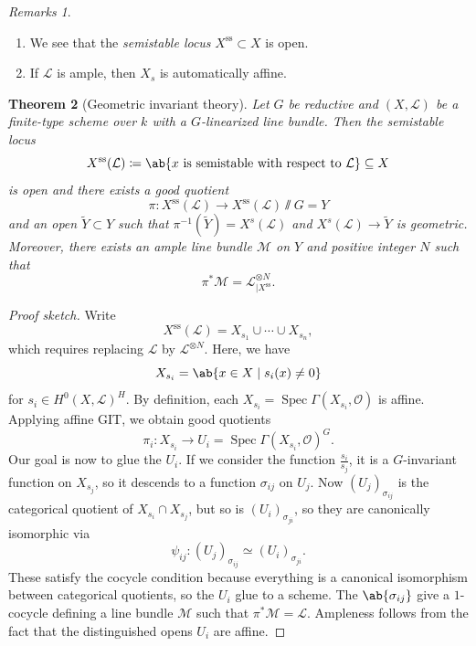 \documentclass{amsart}
\newtheorem{thm}{Theorem}[section]
\theoremstyle{definition}
\theoremstyle{remark}
\newtheorem{rmks}[thm]{Remarks}
\theoremstyle{plain}
\theoremstyle{definition}
\theoremstyle{remark}
\newcommand{\mc}[1]{\mathcal{#1}}
\newcommand{\on}[1]{\operatorname{#1}}
\newcommand{\1}{\mathbf{1}}
\newcommand{\2}{\mathbf{2}}
\newcommand{\3}{\mathbf{3}}
\DeclareMathOperator{\Spec}{Spec}
\begin{document}
\begin{rmks}\leavevmode
    \begin{enumerate}
        \item We see that the \textit{semistable locus} \(X^{\on{ss}} \subset X\) is open.
        \item If \(\mc{L}\) is ample, then \(X_s\) is automatically affine.
    \end{enumerate}
\end{rmks}

\begin{thm}[Geometric invariant theory]
    Let \(G\) be reductive and \((X, \mc{L})\) be a finite-type scheme over \(k\) with a \(G\)-linearized line bundle. Then the \textit{semistable locus}
    \[ X^{\on{ss}}(\mc{L}) \coloneqq \ab\{ x \text{ is semistable with respect to } \mc{L} \} \subseteq X \]
    is open and there exists a good quotient
    \[ \pi \colon X^{\on{ss}}(\mc{L}) \to X^{\on{ss}}(\mc{L}) \sslash G = Y \]
    and an open \(\tilde{Y} \subset Y\) such that \(\pi^{-1}(\tilde{Y}) = X^s(\mc{L})\) and \(X^s(\mc{L}) \to \tilde{Y}\) is geometric. Moreover, there exists an ample line bundle \(\mc{M}\) on \(Y\) and positive integer \(N\) such that 
    \[ \pi^* \mc{M} = \mc{L}^{\otimes N}_{|X^{\on{ss}}}. \]
\end{thm}
\begin{proof}[Proof sketch]
    Write
    \[ X^{\on{ss}}(\mc{L}) = X_{s_1} \cup \cdots \cup X_{s_n}, \]
    which requires replacing \(\mc{L}\) by \(\mc{L}^{\otimes N}\). Here, we have
    \[ X_{s_i} = \ab\{x \in X \mid s_i(x) \neq 0 \} \]
    for \(s_i \in H^0(X, \mc{L})^H\). By definition, each \(X_{s_i} = \Spec \Gamma(X_{s_i}, \mc{O})\) is affine. Applying affine GIT, we obtain good quotients
    \[ \pi_i \colon X_{s_i} \to U_i = \Spec \Gamma(X_{s_i}, \mc{O})^G. \]
    Our goal is now to glue the \(U_i\). If we consider the function \(\frac{s_i}{s_j}\), it is a \(G\)-invariant function on \(X_{s_j}\), so it descends to a function \(\sigma_{ij}\) on \(U_j\). Now \((U_j)_{\sigma_{ij}}\) is the categorical quotient of \(X_{s_i} \cap X_{s_j}\), but so is \((U_i)_{\sigma_{ji}}\), so they are canonically isomorphic via
    \[ \psi_{ij} \colon (U_j)_{\sigma_{ij}} \simeq (U_i)_{\sigma_{ji}}. \]
    These satisfy the cocycle condition because everything is a canonical isomorphism between categorical quotients, so the \(U_i\) glue to a scheme. The \(\ab\{\sigma_{ij}\}\) give a \(1\)-cocycle defining a line bundle \(\mc{M}\) such that \(\pi^* \mc{M} = \mc{L}\). Ampleness follows from the fact that the distinguished opens \(U_i\) are affine.
\end{proof}
\end{document}
